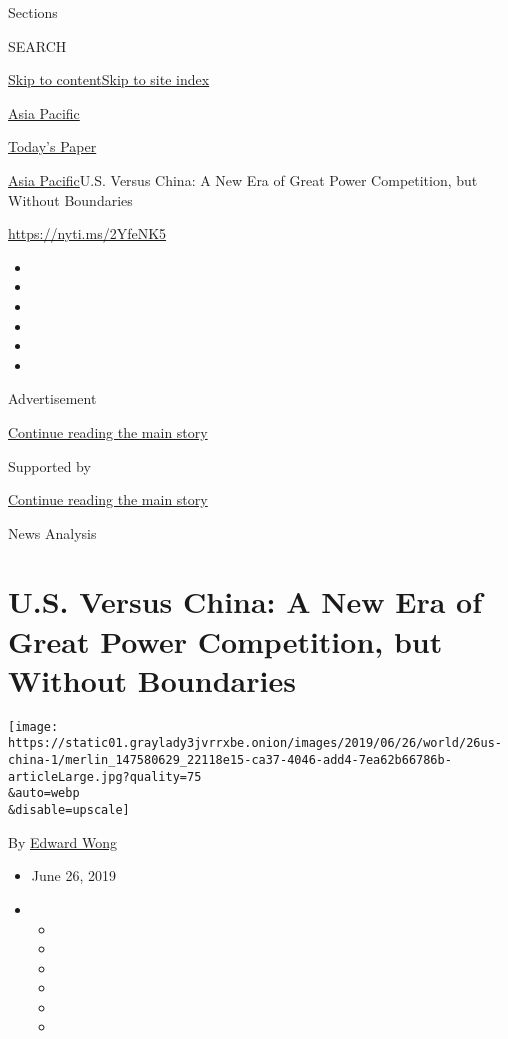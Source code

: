 Sections

SEARCH

\protect\hyperlink{site-content}{Skip to
content}\protect\hyperlink{site-index}{Skip to site index}

\href{https://www.nytimes3xbfgragh.onion/section/world/asia}{Asia
Pacific}

\href{https://myaccount.nytimes3xbfgragh.onion/auth/login?response_type=cookie\&client_id=vi}{}

\href{https://www.nytimes3xbfgragh.onion/section/todayspaper}{Today's
Paper}

\href{/section/world/asia}{Asia Pacific}\textbar{}U.S. Versus China: A
New Era of Great Power Competition, but Without Boundaries

\url{https://nyti.ms/2YfeNK5}

\begin{itemize}
\item
\item
\item
\item
\item
\item
\end{itemize}

Advertisement

\protect\hyperlink{after-top}{Continue reading the main story}

Supported by

\protect\hyperlink{after-sponsor}{Continue reading the main story}

News Analysis

\hypertarget{us-versus-china-a-new-era-of-great-power-competition-but-without-boundaries}{%
\section{U.S. Versus China: A New Era of Great Power Competition, but
Without
Boundaries}\label{us-versus-china-a-new-era-of-great-power-competition-but-without-boundaries}}

\texttt{[image: https://static01.graylady3jvrrxbe.onion/images/2019/06/26/world/26us-china-1/merlin\_147580629\_22118e15-ca37-4046-add4-7ea62b66786b-articleLarge.jpg?quality=75\\\&auto=webp\\\&disable=upscale]}

By \href{https://www.nytimes3xbfgragh.onion/by/edward-wong}{Edward Wong}

\begin{itemize}
\item
  June 26, 2019
\item
  \begin{itemize}
  \item
  \item
  \item
  \item
  \item
  \item
  \end{itemize}
\end{itemize}

